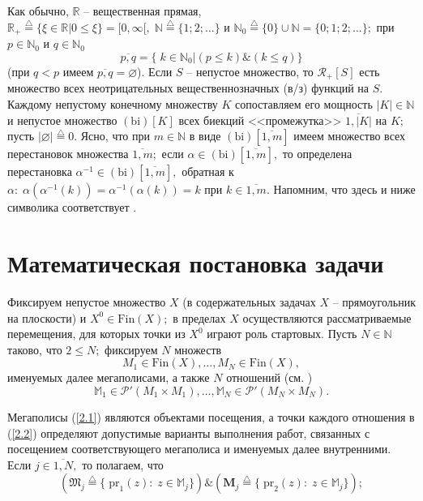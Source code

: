 \documentclass[10pt]{SPIIRAS_Proceedings}
\begin{document}
Как обычно,
$\mathbb{R}$ -- вещественная прямая,
$\mathbb{R}_+ \stackrel{\triangle}{=} \{\xi \in \mathbb{R} \vert 0 \le \xi\} = [0,\infty[,\;\mathbb{N} \stackrel{\triangle}{=} \{1;2;...\}$
и $\mathbb{N}_0 \stackrel{\triangle}{=} \{0\} \cup \mathbb{N} = \{0;1;2;...\};$
при $p \in \mathbb{N}_0$ и $q \in \mathbb{N}_0$
$$
\overline{p,q} = \{\;k \in \mathbb{N}_0 \vert (p \le k) \& (k \le q)\}
$$
(при $q < p$ имеем $\overline{p,q} = \varnothing$).
Если $S$ -- непустое множество, то
$\mathcal{R}_+[S]$
есть множество всех неотрицательных вещественнозначных (в/з) функций на $S.$
Каждому непустому конечному множеству $K$
сопоставляем его мощность $|K| \in \mathbb{N}$
и непустое множество $(\mathrm{bi})[K]$
всех биекций
\cite[c.~87]{17} <<промежутка>>
$\overline{1,|K|}$ на $K;$
пусть
$|\varnothing| \stackrel{\triangle}{=} 0.$
Ясно, что при
$m \in \mathbb{N}$ в виде $(\mathrm{bi})[\overline{1,m}]$
имеем множество всех перестановок
\cite[c.~87]{17} множества
$\overline{1,m};$
если $\alpha \in (\mathrm{bi})[\overline{1,m}],$
то определена перестановка
$\alpha^{-1} \in (\mathrm{bi})[\overline{1,m}],$
обратная к
$\alpha:\;\alpha(\alpha^{-1}(k)) = \alpha^{-1}(\alpha(k)) = k$
при $k \in \overline{1,m}.$
Напомним, что здесь и ниже символика соответствует
\cite[$\S$3.1]{4}.

\section{Математическая постановка задачи}
\label{sec:2}

Фиксируем непустое множество $X$
(в содержательных задачах \cite{4}
$X$ -- прямоугольник на плоскости)
и $X^0 \in \mathrm{Fin}(X);$
в пределах $X$ осуществляются рассматриваемые перемещения,
для которых точки из $X^0$ играют роль стартовых.
Пусть $N \in \mathbb{N}$ таково,
что $2 \le N;$
фиксируем $N$ множеств
\begin{equation}\label{2.1}
M_1 \in \mathrm{Fin}(X),...,M_N \in \mathrm{Fin}(X),
\end{equation}
именуемых далее мегаполисами, а
также $N$ отношений (см. \cite[гл.II,$\S$4]{15})
\begin{equation}\label{2.2}
\mathbb{M}_1 \in \mathcal{P}'(M_1 \times M_1),...,\mathbb{M}_N \in \mathcal{P}'(M_N \times M_N).
\end{equation}

Мегаполисы (\ref{2.1})
являются объектами посещения,
а точки каждого отношения в (\ref{2.2})
определяют допустимые варианты выполнения работ,
связанных с посещением соответствующего мегаполиса и именуемых далее внутренними.
Если $j \in \overline{1,N},$
то полагаем, что
\begin{equation}\label{2.3}
(\mathfrak{M}_j \stackrel{\triangle}{=}
\{\;\mathrm{pr}_1(z):\;z \in \mathbb{M}_j\})
\& (\mathbf{M}_j \stackrel{\triangle}{=}
\{\;\mathrm{pr}_2(z):\;z \in \mathbb{M}_j\});
\end{equation}
\end{document}
